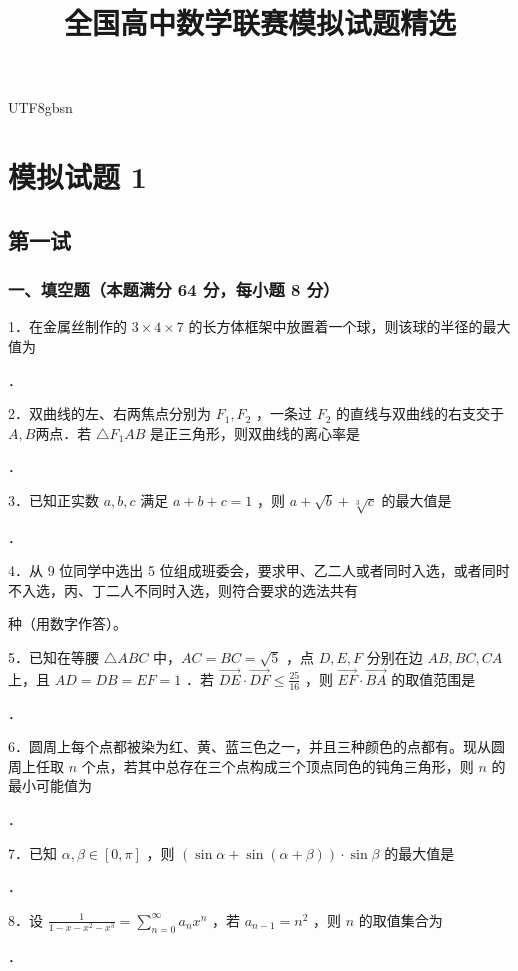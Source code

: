 \documentclass[a4paper,UTF8]{article}
\title{全国高中数学联赛模拟试题精选}
\theoremstyle{plain}
\theoremstyle{definition}
\newif\ifshowanswers
\newcommand{\blank}[2][2cm]{%
	\ifshowanswers
	\underline{\makebox[#1][c]{#2}}%
	\else
	\underline{\hspace*{#1}}%
	\fi
}
\begin{document}
\begin{CJK}{UTF8}{gbsn}
	
	\maketitle
	
	\section{模拟试题 1}
	\subsection{第一试}
	\subsubsection*{一、填空题（本题满分 64 分，每小题 8 分）}
	
	1．在金属丝制作的 $3 \times 4 \times 7$ 的长方体框架中放置着一个球，则该球的半径的最大值为\blank{$5/2$}．
	
	2．双曲线的左、右两焦点分别为 $F_1, F_2$ ，一条过 $F_2$ 的直线与双曲线的右支交于 $A, B$两点．若 $\triangle F_1 A B$ 是正三角形，则双曲线的离心率是 \blank{$\sqrt{3}$}．
	
	3．已知正实数 $a, b, c$ 满足 $a+b+c=1$ ，则 $a+\sqrt{b}+\sqrt[3]{c}$ 的最大值是 \blank{$\frac54+\frac{2\sqrt{3}}{9}$}．
	
	4．从 9 位同学中选出 5 位组成班委会，要求甲、乙二人或者同时入选，或者同时不入选，丙、丁二人不同时入选，则符合要求的选法共有 \blank{$41$} 种（用数字作答）。
	
	5．已知在等腰 $\triangle A B C$ 中，$A C=B C=\sqrt{5}$ ，点 $D, E, F$ 分别在边 $A B, B C, C A$ 上，且 $A D=D B=E F=1$ ．若 $\overrightarrow{D E} \cdot \overrightarrow{D F} \leqslant \frac{25}{16}$ ，则 $\overrightarrow{E F} \cdot \overrightarrow{B A}$ 的取值范围是 \blank{$\left[\frac43,2\right]$}．
	
	6．圆周上每个点都被染为红、黄、蓝三色之一，并且三种颜色的点都有。现从圆周上任取 $n$ 个点，若其中总存在三个点构成三个顶点同色的钝角三角形，则 $n$ 的最小可能值为
	\blank{13}．
	
	7．已知 $\alpha, \beta \in[0, \pi]$ ，则 $(\sin \alpha+\sin (\alpha+\beta)) \cdot \sin \beta$ 的最大值是 \blank{$\frac{8\sqrt{3}}{9}$}．
	
	8．设 $\frac{1}{1-x-x^2-x^3}=\sum_{n=0}^{\infty} a_n x^n$ ，若 $a_{n-1}=n^2$ ，则 $n$ 的取值集合为 \blank{$\{1,9\}$}．
	
	
	
\end{CJK}
\end{document}
